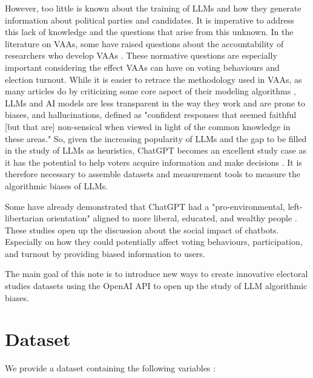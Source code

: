 \documentclass{article}
\begin{document}
However, too little is known about the training of LLMs and how they generate information about political parties and candidates. It is imperative to address this lack of knowledge and the questions that arise from this unknown. In the literature on VAAs, some have raised questions about the accountability of researchers who develop VAAs \parencite{ladner_etal10, romeromoreno_etal22}. These normative questions are especially important considering the effect VAAs can have on voting behaviours and election turnout. While it is easier to retrace the methodology used in VAAs, as many articles do by criticizing some core aspect of their modeling algorithms \parencite{vanderlinden_dufresne17, louwerse_rosema14, romeromoreno_etal22}, LLMs and AI models are less transparent in the way they work and are prone to biases, and hallucinations, defined as "confident responses that seemed faithful [but that are] non-sensical when viewed in light of the common knowledge in these areas." \parencite{alkaissi_mcfarlane23} So, given the increasing popularity of LLMs and the gap to be filled in the study of LLMs as heuristics, ChatGPT becomes an excellent study case as it has the potential to help voters acquire information and make decisions \parencite{hartmann_etal23}. It is therefore necessary to assemble datasets and measurement tools to measure the algorithmic biases of LLMs.\par

Some have already demonstrated that ChatGPT had a "pro-environmental, left-libertarian orientation" aligned to more liberal, educated, and wealthy people \parencite{hartmann_etal23, santurkar_etal23, rutinowski_etal23, kim_lee23}. These studies open up the discussion about the social impact of chatbots. Especially on how they could potentially affect voting behaviours, participation, and turnout by providing biased information to users. \par

The main goal of this note is to introduce new ways to create innovative electoral studies datasets using the OpenAI API to open up the study of LLM algorithmic biases.

\section{Dataset}

We provide a dataset containing the following variables :
\end{document}
